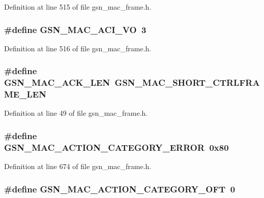 Definition at line 515 of file gsn\_\-mac\_\-frame.h.

\hypertarget{a00523_a432cc7cfe39a06339138bb0c2ee23414}{
\subsubsection[{GSN\_\-MAC\_\-ACI\_\-VO}]{\setlength{\rightskip}{0pt plus 5cm}\#define GSN\_\-MAC\_\-ACI\_\-VO~3}}
\label{a00523_a432cc7cfe39a06339138bb0c2ee23414}


Definition at line 516 of file gsn\_\-mac\_\-frame.h.

\hypertarget{a00523_affaed9a7768b7cf27e51be6b57f685d9}{
\subsubsection[{GSN\_\-MAC\_\-ACK\_\-LEN}]{\setlength{\rightskip}{0pt plus 5cm}\#define GSN\_\-MAC\_\-ACK\_\-LEN~GSN\_\-MAC\_\-SHORT\_\-CTRLFRAME\_\-LEN}}
\label{a00523_affaed9a7768b7cf27e51be6b57f685d9}


Definition at line 49 of file gsn\_\-mac\_\-frame.h.

\hypertarget{a00523_a8a44d10ea88b5c236500204bcb1ec34c}{
\subsubsection[{GSN\_\-MAC\_\-ACTION\_\-CATEGORY\_\-ERROR}]{\setlength{\rightskip}{0pt plus 5cm}\#define GSN\_\-MAC\_\-ACTION\_\-CATEGORY\_\-ERROR~0x80}}
\label{a00523_a8a44d10ea88b5c236500204bcb1ec34c}


Definition at line 674 of file gsn\_\-mac\_\-frame.h.

\hypertarget{a00523_a5a4e023b60dea0070ada3323f21b12a2}{
\subsubsection[{GSN\_\-MAC\_\-ACTION\_\-CATEGORY\_\-OFT}]{\setlength{\rightskip}{0pt plus 5cm}\#define GSN\_\-MAC\_\-ACTION\_\-CATEGORY\_\-OFT~0}}
\label{a00523_a5a4e023b60dea0070ada3323f21b12a2}



